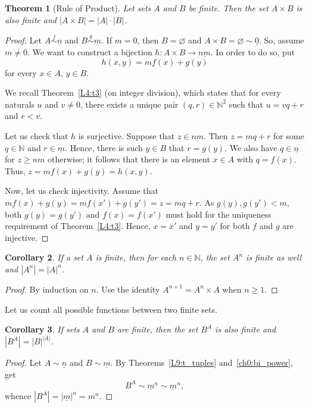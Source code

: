 \documentclass[12pt,notitlepage]{article}
\theoremstyle{plain}
\newtheorem{thm}{Theorem}[section]
\newtheorem{corr}[thm]{Corollary}
\theoremstyle{definition}
\theoremstyle{plain}
\newcommand{\N}{\mathbb{N}}
\newcommand{\void}{\varnothing}
\newcommand{\ul}[1]{\underline{#1}}
\newcommand{\1}{\mathbf{1}}
\newcommand{\0}{\mathbf{0}}
\begin{document}
\begin{thm}[Rule of Product]\label{L10:prod}
Let sets $A$ and $B$ be finite. Then the set $A \times B$ is also finite and $|A \times B| = |A| \cdot |B|$.
\end{thm}
\begin{proof}
Let $A \stackrel{f}{\sim} \ul{n}$ and $B \stackrel{g}{\sim} \ul{m}$. If $m = 0$, then $B = \void$ and $A \times B = \void \sim \ul{0}$. So, assume $m \neq 0$. We want to construct a bijection $h\colon A \times B \to \ul{nm}$. In order to do so, put
$$h(x, y) = mf(x) + g(y)$$
for every $x \in A$, $y\in B$.

We recall Theorem~\ref{L4:t3} (on integer division), which states that for every naturals $u$ and $v \neq 0$, there exists a unique pair  $(q,r) \in \N^2$ such that $u = vq + r$ and $r < v$.

Let us check that $h$ is surjective. Suppose that $z \in \ul{nm}$. Then $z = mq + r$ for some $q \in \N$ and $r \in \ul{m}$. Hence, there is such $y \in B$ that $r = g(y)$. We also have $q \in \ul{n}$ for $z \geq nm$ otherwise; it follows that there is an element $x \in A$ with $q = f(x)$. Thus, $z = mf(x) + g(y) = h(x, y)$.

Now, let us check injectivity. Assume that $mf(x) + g(y) = mf(x') + g(y') = z = mq + r$. As $g(y), g(y') < m$, both $g(y) =  g(y')$ and $f(x) = f(x')$ must hold for the uniqueness requirement of Theorem~\ref{L4:t3}. Hence, $x = x'$ and $y = y'$ for both $f$ and $g$ are injective.
\end{proof}

\begin{corr}\label{L10:num_tuple}
If a set $A$ is finite, then for each $n \in \N$, the set $A^n$ is finite as well and $|A^n| = |A|^n$.
\end{corr}
\begin{proof}
By induction on $n$. Use the identity $A^{n+1} = A^n \times A$ when $n \geq 1$.
\end{proof}

Let us count all possible functions between two finite sets.
\begin{corr}\label{L10:num_func}
If sets $A$ and $B$ are finite, then the set $B^A$ is also finite and $|B^A| = |B|^{|A|}$.
\end{corr}
\begin{proof}
Let $A \sim \ul{n}$ and $B \sim \ul{m}$. By Theorems~\ref{L9:t_tuples} and~\ref{ch0:bi_power}, get
$$B^A \sim \ul{m}^{\ul{n}} \sim \ul{m}^n,$$
whence $|B^A| = |\ul{m}|^n = m^n$.
\end{proof}
\end{document}
